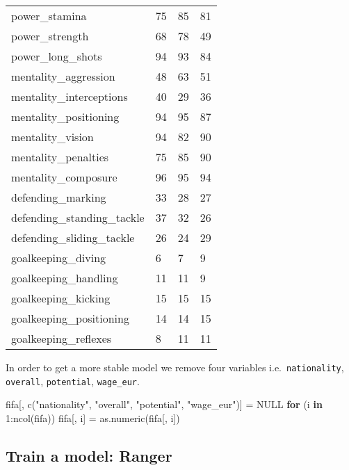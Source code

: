 \documentclass[
]{scrbook}
\newenvironment{Shaded}{\begin{snugshade}}{\end{snugshade}}
\newcommand{\ConstantTok}[1]{\textcolor[rgb]{0.00,0.00,0.00}{#1}}
\newcommand{\ControlFlowTok}[1]{\textcolor[rgb]{0.13,0.29,0.53}{\textbf{#1}}}
\newcommand{\DecValTok}[1]{\textcolor[rgb]{0.00,0.00,0.81}{#1}}
\newcommand{\FunctionTok}[1]{\textcolor[rgb]{0.00,0.00,0.00}{#1}}
\newcommand{\NormalTok}[1]{#1}
\newcommand{\OtherTok}[1]{\textcolor[rgb]{0.56,0.35,0.01}{#1}}
\newcommand{\SpecialCharTok}[1]{\textcolor[rgb]{0.00,0.00,0.00}{#1}}
\newcommand{\StringTok}[1]{\textcolor[rgb]{0.31,0.60,0.02}{#1}}
\renewenvironment{Shaded} {\begin{snugshade}\small} {\end{snugshade}}
\begin{document}
\begin{longtable}[]{@{}llll@{}}
power\_stamina & 75 & 85 & 81 \\
power\_strength & 68 & 78 & 49 \\
power\_long\_shots & 94 & 93 & 84 \\
mentality\_aggression & 48 & 63 & 51 \\
mentality\_interceptions & 40 & 29 & 36 \\
mentality\_positioning & 94 & 95 & 87 \\
mentality\_vision & 94 & 82 & 90 \\
mentality\_penalties & 75 & 85 & 90 \\
mentality\_composure & 96 & 95 & 94 \\
defending\_marking & 33 & 28 & 27 \\
defending\_standing\_tackle & 37 & 32 & 26 \\
defending\_sliding\_tackle & 26 & 24 & 29 \\
goalkeeping\_diving & 6 & 7 & 9 \\
goalkeeping\_handling & 11 & 11 & 9 \\
goalkeeping\_kicking & 15 & 15 & 15 \\
goalkeeping\_positioning & 14 & 14 & 15 \\
goalkeeping\_reflexes & 8 & 11 & 11 \\
\bottomrule
\end{longtable}

In order to get a more stable model we remove four variables i.e.~\texttt{nationality}, \texttt{overall}, \texttt{potential}, \texttt{wage\_eur}.

\begin{Shaded}
\begin{Highlighting}[]
\NormalTok{fifa[, }\FunctionTok{c}\NormalTok{(}\StringTok{"nationality"}\NormalTok{, }\StringTok{"overall"}\NormalTok{, }\StringTok{"potential"}\NormalTok{, }\StringTok{"wage\_eur"}\NormalTok{)] }\OtherTok{=} \ConstantTok{NULL}
\ControlFlowTok{for}\NormalTok{ (i }\ControlFlowTok{in} \DecValTok{1}\SpecialCharTok{:}\FunctionTok{ncol}\NormalTok{(fifa)) fifa[, i] }\OtherTok{=} \FunctionTok{as.numeric}\NormalTok{(fifa[, i])}
\end{Highlighting}
\end{Shaded}

\hypertarget{interpretability-train-ranger}{%
\subsection{Train a model: Ranger}\label{interpretability-train-ranger}}
\end{document}
